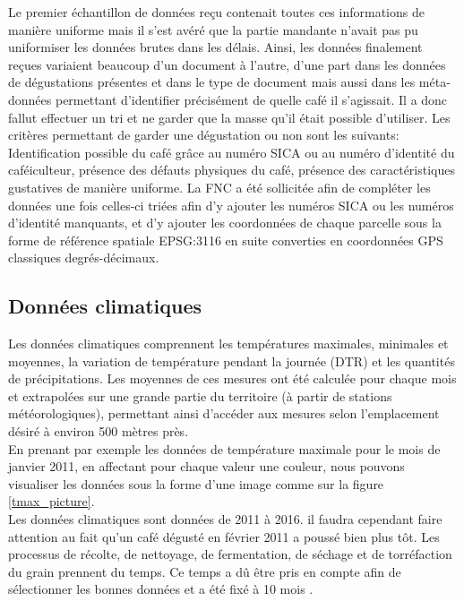 \noindent Le premier échantillon de données reçu contenait toutes ces informations de manière uniforme mais il s'est avéré que la partie mandante n'avait pas pu uniformiser les données brutes dans les délais. Ainsi, les données finalement reçues variaient beaucoup d'un document à l'autre, d'une part dans les données de dégustations présentes et dans le type de document mais aussi dans les méta-données permettant d'identifier précisément de quelle café il s'agissait. Il a donc fallut effectuer un tri et ne garder que la masse qu'il était possible d'utiliser. Les critères permettant de garder une dégustation ou non sont les suivants: Identification possible du café grâce au numéro SICA ou au numéro d'identité du caféiculteur, présence des défauts physiques du café, présence des caractéristiques gustatives de manière uniforme. La FNC a été sollicitée afin de compléter les données une fois celles-ci triées afin d'y ajouter les numéros SICA ou les numéros d'identité manquants, et d'y ajouter les coordonnées de chaque parcelle sous la forme de référence spatiale EPSG:3116 en suite converties en coordonnées GPS classiques degrés-décimaux.\\

 
\subsection{Données climatiques}
Les données climatiques comprennent les températures maximales, minimales et moyennes, la variation de température pendant la journée (DTR) et les quantités de précipitations. Les moyennes de ces mesures ont été calculée pour chaque mois et extrapolées sur une grande partie du territoire (à partir de stations météorologiques), permettant ainsi d’accéder aux mesures selon l’emplacement désiré à environ 500 mètres près. \\

\noindent En prenant par exemple les données de température maximale pour le mois de janvier 2011, en affectant pour chaque valeur une couleur, nous pouvons visualiser les données sous la forme d'une image comme sur la figure \ref{tmax_picture}.\\

\noindent Les données climatiques sont données de 2011 à 2016. il faudra cependant faire attention au fait qu'un café dégusté en février 2011 a poussé bien plus tôt. Les processus de récolte, de nettoyage, de fermentation, de séchage et de torréfaction du grain prennent du temps. Ce temps a dû être pris en compte afin de sélectionner les bonnes données et a été fixé à 10 mois . 


